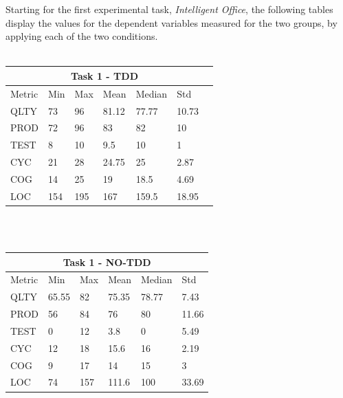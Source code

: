 \noindent Starting for the first experimental task, \textit{Intelligent Office}, the following tables display the values for the dependent variables measured for the two groups, by applying each of the two conditions.
\\ \  \\
\noindent
\begin{tabular}{ |p{2cm}||p{1.6cm}|p{1.6cm}|p{1.6cm}|p{1.6cm}|p{1.6cm}|p{1.6cm}| }
    \hline
        \multicolumn{6}{|c|}{Task 1 - TDD} \\
    \hline
        Metric & Min & Max & Mean & Median & Std \\
    \hline
        QLTY & 73 & 96 & 81.12 & 77.77 & 10.73 \\
        PROD & 72 & 96 & 83 & 82 & 10 \\
        TEST & 8 & 10 & 9.5 & 10 & 1 \\
        CYC & 21 & 28 & 24.75 & 25 & 2.87 \\
        COG & 14 & 25 & 19 & 18.5 & 4.69 \\
        LOC & 154 & 195 & 167 & 159.5 & 18.95 \\
    \hline
\end{tabular}
\\ \  \\
\noindent
\begin{tabular}{ |p{2cm}||p{1.6cm}|p{1.6cm}|p{1.6cm}|p{1.6cm}|p{1.6cm}|}
    \hline
        \multicolumn{6}{|c|}{Task 1 - NO-TDD} \\
    \hline
        Metric & Min & Max & Mean & Median & Std\\
    \hline
        QLTY & 65.55 & 82 & 75.35 & 78.77 & 7.43 \\
        PROD & 56 & 84 & 76 & 80 & 11.66 \\
        TEST & 0 & 12 & 3.8 & 0 & 5.49 \\
        CYC & 12 & 18 & 15.6 & 16 & 2.19 \\
        COG & 9 & 17 & 14 & 15 & 3 \\
        LOC & 74 & 157 & 111.6 & 100 & 33.69 \\
    \hline
\end{tabular}
\\ \  \\




